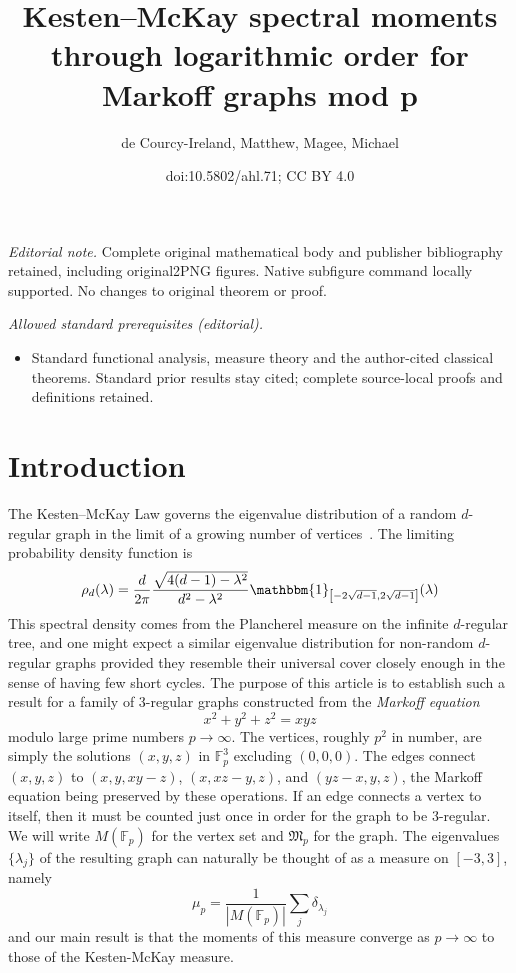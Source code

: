 \documentclass[10pt]{amsart}
\title{Kesten–McKay spectral moments through logarithmic order for Markoff graphs mod p}
\author{de Courcy-Ireland, Matthew, Magee, Michael}
\date{doi:10.5802/ahl.71; CC BY 4.0}
\theoremstyle{definition}\newtheorem{defi}[theo]{Definition}\newtheorem{rema}[theo]{Remark}\newtheorem{exam}[theo]{Example}\newtheorem{exem}[theo]{Example}\newtheorem{nota}[theo]{Notation}
\newcommand{\F}{\mathbb{F}}
\begin{document}
\maketitle
\noindent\textit{Editorial note.} Complete original mathematical body and publisher bibliography retained, including original2PNG figures. Native subfigure command locally supported. No changes to original theorem or proof.\par\medskip
\noindent\textit{Allowed standard prerequisites (editorial).}\begin{itemize}
\item Standard functional analysis, measure theory and the author-cited classical theorems. Standard prior results stay cited; complete source-local proofs and definitions retained.
\end{itemize}\medskip



\section{Introduction}\label{sec:introduction}

The Kesten--McKay Law governs the eigenvalue distribution of a random $d$-regular graph in the limit of a growing number of vertices~\cite{K,M}. The limiting probability density function is
\begin{equation}
\rho_d(\lambda) = \frac{d}{2\pi} \frac{ \sqrt{4(d-1) - \lambda^2} }{d^2 - \lambda^2} \mathbbm{1}_{\left[-2\sqrt{d-1},2\sqrt{d-1}\right]}(\lambda)
\end{equation}
This spectral density comes from the Plancherel measure on the infinite $d$-regular tree, and one might expect a similar eigenvalue distribution for non-random $d$-regular graphs provided they resemble their universal cover closely enough in the sense of having few short cycles. The purpose of this article is to establish such a result for a family of 3-regular graphs constructed from the \emph{Markoff equation}
\begin{equation}\label{eqn:markoff}
x^2+y^2+z^2=xyz
\end{equation}
modulo large prime numbers $p \rightarrow \infty$. The vertices, roughly $p^2$ in number, are simply the solutions $(x,y,z)$ in $\F_p^3$ excluding $(0,0,0)$. The edges connect $(x,y,z)$ to $(x,y,xy-z)$, $(x, xz-y, z)$, and $(yz-x,y,z)$, the Markoff equation being preserved by these operations. If an edge connects a vertex to itself, then it must be counted just once in order for the graph to be 3-regular. We will write $M(\F_p)$ for the vertex set and $\mathfrak{M}_p$ for the graph. The eigenvalues $\{ \lambda_j \}$ of the resulting graph can naturally be thought of as a measure on $[-3,3]$, namely
\begin{equation}\label{eqn:empirical}
\mu_p = \frac{1}{|M(\F_p)|} \sum_j \delta_{\lambda_j}
\end{equation}
and our main result is that the moments of this measure converge as $p \rightarrow \infty$ to those of the Kesten-McKay measure.
\end{document}

